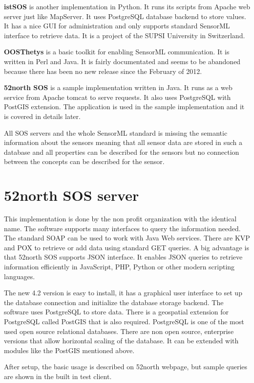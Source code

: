 \textbf{istSOS} is another implementation in Python\cite{istsos}. It runs its scripts from Apache web server just like MapServer. It uses PostgreSQL database backend to store values. It has a nice GUI for administration and only supports standard SensorML interface to retrieve data. It is a project of the SUPSI University in Switzerland.

\textbf{OOSThetys} is a basic toolkit for enabling SensorML communication. It is written in Perl and Java. It is fairly documentated and seems to be abandoned because there has been no new release since the February of 2012.

\textbf{52north SOS} is a sample implementation written in Java\cite{52north}. It runs as a web service from Apache tomcat to serve requests. It also uses PostgreSQL with PostGIS extension. The application is used in the sample implementation and it is covered in details later.

All SOS servers and the whole SensorML standard is missing the semantic information about the sensors meaning that all sensor data are stored in such a database and all properties can be described for the sensors but no connection between the concepts can be described for the sensor.

\section{52north SOS server}

This implementation is done by the non profit organization with the identical name. The software supports many interfaces to query the information needed. The standard SOAP can be used to work with Java Web services. There are KVP and POX to retrieve or add data using standard GET queries. A big advantage is that 52north SOS supports JSON interface. It enables JSON queries to retrieve information efficiently in JavaScript, PHP, Python or other modern scripting languages.

The new 4.2 version is easy to install, it has a graphical user interface to set up the database connection and initialize the database storage backend. The software uses PostgreSQL to store data. There is a geospatial extension for PostgreSQL called PostGIS that is also required. PostgreSQL is one of the most used open source relational databases. There are non open source, enterprise versions that allow horizontal scaling of the database. It can be extended with modules like the PostGIS mentioned above.

After setup, the basic usage is described on 52north webpage, but sample queries are shown in the built in test client. 


